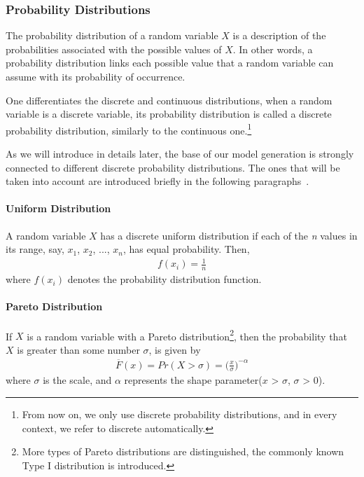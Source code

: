 \subsubsection{Probability Distributions}The probability distribution of a random variable $X$ is a description of the probabilities
associated with the possible values of $X$. In other words, a probability distribution links each possible value that a random variable can assume with its probability of occurrence.

One differentiates the discrete and continuous distributions, when a random variable is a discrete variable, its probability distribution is called a discrete probability distribution, similarly to the continuous one.\footnote{From now on, we only use discrete probability distributions, and in every context, we refer to discrete automatically.} %

As we will introduce in details later, the base of our model generation is strongly connected to different discrete probability distributions. The ones that will be taken into account are introduced briefly in the following paragraphs~\cite{distributions}.

\paragraph{Uniform Distribution}

A random variable $X$ has a discrete uniform distribution if each of the \textit{n} values in
its range, say, $x_1$, $x_2$, ..., $x_n$, has equal probability. Then,
\begin{align}
	f(x_i) = \frac{1}{n}
\end{align}
where $f(x_i)$ denotes the probability distribution function.

\paragraph{Pareto Distribution}

If $X$ is a random variable with a Pareto distribution\footnote{More types of Pareto distributions are distinguished, the commonly known Type I distribution is introduced.}, then the probability that $X$ is greater than some number $\sigma$, is given by
\begin{align}
	\overline{F}(x) = Pr(X>\sigma) = \Big( \frac{x}{\sigma} \Big)^{-\alpha}
\end{align}
where $\sigma$ is the scale, and $\alpha$ represents the shape parameter($x$ > $\sigma$, $\sigma$ > 0).

